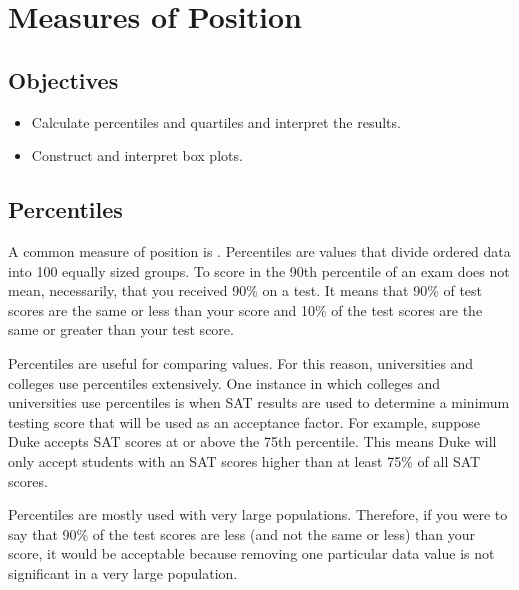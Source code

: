 \documentclass[letterpaper,10pt,english]{jupyterBook}
\begin{document}
\sphinxstepscope


\section{Measures of Position}
\label{\detokenize{Ch2 Descriptive Statistics/2.1 Measures of Position:measures-of-position}}\label{\detokenize{Ch2 Descriptive Statistics/2.1 Measures of Position::doc}}

\subsection{Objectives}
\label{\detokenize{Ch2 Descriptive Statistics/2.1 Measures of Position:objectives}}\begin{itemize}
\item {} 
\sphinxAtStartPar
Calculate percentiles and quartiles and interpret the results.

\item {} 
\sphinxAtStartPar
Construct and interpret box plots.

\end{itemize}


\subsection{Percentiles}
\label{\detokenize{Ch2 Descriptive Statistics/2.1 Measures of Position:percentiles}}
\sphinxAtStartPar
A common measure of position is . Percentiles are values that divide ordered data into 100 equally sized groups. To score in the 90th percentile of an exam does not mean, necessarily, that you received 90\% on a test. It means that 90\% of test scores are the same or less than your score and 10\% of the test scores are the same or greater than your test score.

\sphinxAtStartPar
Percentiles are useful for comparing values. For this reason, universities and colleges use percentiles extensively. One instance in which colleges and universities use percentiles is when SAT results are used to determine a minimum testing score that will be used as an acceptance factor. For example, suppose Duke accepts SAT scores at or above the 75th percentile. This means Duke will only accept students with an SAT scores higher than at least 75\% of all SAT scores.

\sphinxAtStartPar
Percentiles are mostly used with very large populations. Therefore, if you were to say that 90\% of the test scores are less (and not the same or less) than your score, it would be acceptable because removing one particular data value is not significant in a very large population.
\end{document}
